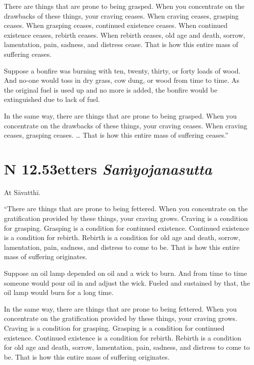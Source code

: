 \documentclass[12pt,openany]{book}%
\newcommand*{\suttatitleacronym}[1]{\smaller[2]{#1}\vspace*{.3em}}
\newcommand*{\suttatitletranslation}[1]{\linebreak{#1}}
\newcommand*{\suttatitleroot}[1]{\linebreak\smaller[2]\itshape{#1}}
\newcommand*{\tocacronym}[1]{\hspace*{-3.3em}{#1}\quad}
\newcommand*{\toctranslation}[1]{#1}
\newcommand*{\tocroot}[1]{(\textit{#1})}
\begin{document}
There are things that are prone to being grasped. When you concentrate on the drawbacks of these things, your craving ceases. When craving ceases, grasping ceases. When grasping ceases, continued existence ceases. When continued existence ceases, rebirth ceases. When rebirth ceases, old age and death, sorrow, lamentation, pain, sadness, and distress cease. That is how this entire mass of suffering ceases. 

Suppose a bonfire was burning with ten, twenty, thirty, or forty loads of wood. And no-one would toss in dry grass, cow dung, or wood from time to time. As the original fuel is used up and no more is added, the bonfire would be extinguished due to lack of fuel. 

In the same way, there are things that are prone to being grasped. When you concentrate on the drawbacks of these things, your craving ceases. When craving ceases, grasping ceases. … That is how this entire mass of suffering ceases.” 

%
\section*{{\suttatitleacronym SN 12.53}{\suttatitletranslation Fetters }{\suttatitleroot Saṁyojanasutta}}
\addcontentsline{toc}{section}{\tocacronym{SN 12.53} \toctranslation{Fetters } \tocroot{Saṁyojanasutta}}

At \textsanskrit{Sāvatthī}. 

“There are things that are prone to being fettered. When you concentrate on the gratification provided by these things, your craving grows. Craving is a condition for grasping. Grasping is a condition for continued existence. Continued existence is a condition for rebirth. Rebirth is a condition for old age and death, sorrow, lamentation, pain, sadness, and distress to come to be. That is how this entire mass of suffering originates. 

Suppose an oil lamp depended on oil and a wick to burn. And from time to time someone would pour oil in and adjust the wick. Fueled and sustained by that, the oil lamp would burn for a long time. 

In the same way, there are things that are prone to being fettered. When you concentrate on the gratification provided by these things, your craving grows. Craving is a condition for grasping. Grasping is a condition for continued existence. Continued existence is a condition for rebirth. Rebirth is a condition for old age and death, sorrow, lamentation, pain, sadness, and distress to come to be. That is how this entire mass of suffering originates. 
\end{document}
